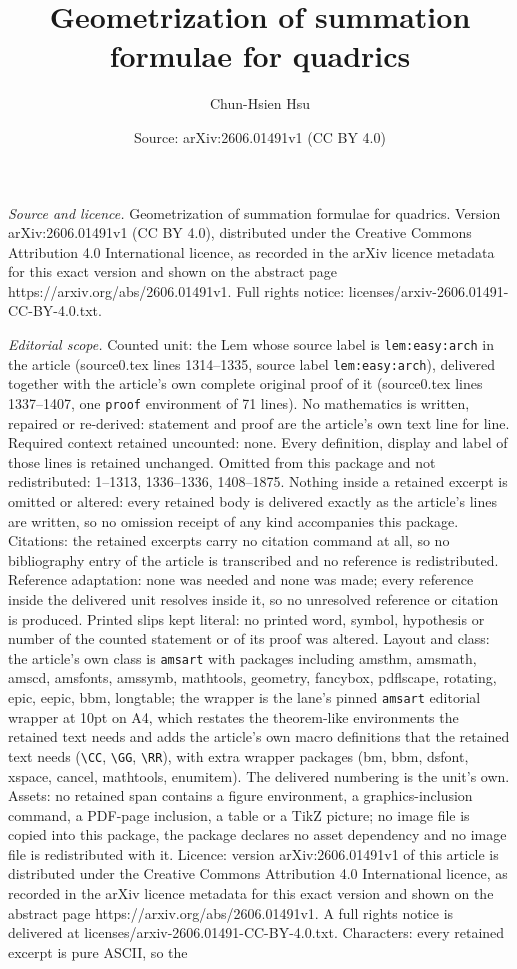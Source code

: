 \documentclass[10pt,a4paper]{amsart}
\title[Geometrization of summation formulae for quadrics]{Geometrization of summation formulae for quadrics}
\author{Chun-Hsien Hsu}
\date{Source: arXiv:2606.01491v1 (CC BY 4.0)}
\begin{document}
\maketitle

\noindent\emph{Source and licence.} Geometrization of summation formulae for quadrics. Version arXiv:2606.01491v1 (CC BY 4.0), distributed under the Creative Commons Attribution 4.0 International licence, as recorded in the arXiv licence metadata for this exact version and shown on the abstract page https://arxiv.org/abs/2606.01491v1. Full rights notice: licenses/arxiv-2606.01491-CC-BY-4.0.txt.\par\smallskip

\noindent\textit{Editorial scope.} Counted unit: the Lem whose source label is \texttt{lem:easy:arch} in the article (source0.tex lines 1314--1335, source label \texttt{lem:easy:arch}), delivered together with the article's own complete original proof of it (source0.tex lines 1337--1407, one \texttt{proof} environment of 71 lines). No mathematics is written, repaired or re-derived: statement and proof are the article's own text line for line. Required context retained uncounted: none. Every definition, display and label of those lines is retained unchanged. Omitted from this package and not redistributed: 1--1313, 1336--1336, 1408--1875. Nothing inside a retained excerpt is omitted or altered: every retained body is delivered exactly as the article's lines are written, so no omission receipt of any kind accompanies this package. Citations: the retained excerpts carry no citation command at all, so no bibliography entry of the article is transcribed and no reference is redistributed. Reference adaptation: none was needed and none was made; every reference inside the delivered unit resolves inside it, so no unresolved reference or citation is produced. Printed slips kept literal: no printed word, symbol, hypothesis or number of the counted statement or of its proof was altered. Layout and class: the article's own class is \texttt{amsart} with packages including amsthm, amsmath, amscd, amsfonts, amssymb, mathtools, geometry, fancybox, pdflscape, rotating, epic, eepic, bbm, longtable; the wrapper is the lane's pinned \texttt{amsart} editorial wrapper at 10pt on A4, which restates the theorem-like environments the retained text needs and adds the article's own macro definitions that the retained text needs (\texttt{\textbackslash CC}, \texttt{\textbackslash GG}, \texttt{\textbackslash RR}), with extra wrapper packages (bm, bbm, dsfont, xspace, cancel, mathtools, enumitem). The delivered numbering is the unit's own. Assets: no retained span contains a figure environment, a graphics-inclusion command, a PDF-page inclusion, a table or a TikZ picture; no image file is copied into this package, the package declares no asset dependency and no image file is redistributed with it. Licence: version arXiv:2606.01491v1 of this article is distributed under the Creative Commons Attribution 4.0 International licence, as recorded in the arXiv licence metadata for this exact version and shown on the abstract page https://arxiv.org/abs/2606.01491v1. A full rights notice is delivered at licenses/arxiv-2606.01491-CC-BY-4.0.txt. Characters: every retained excerpt is pure ASCII, so the 
\end{document}
